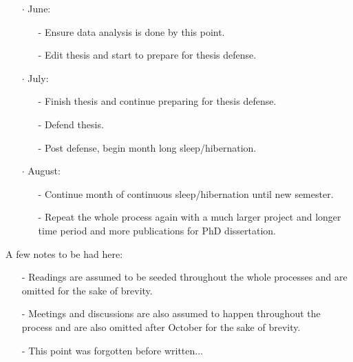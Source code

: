 \documentclass[12pt, letterpaper]{article}
\begin{document}
\begin{itemize}
    \item[$\cdot$] June:
    \begin{itemize}
      \item[-] Ensure data analysis is done by this point.
      \item[-] Edit thesis and start to prepare for thesis defense.\\
    \end{itemize}
    
    \item[$\cdot$] July:
    \begin{itemize}
      \item[-] Finish thesis and continue preparing for thesis defense.
      \item[-] Defend thesis.
      \item[-] Post defense, begin month long sleep/hibernation.\\
    \end{itemize}
    
    \item[$\cdot$] August:
    \begin{itemize}
      \item[-] Continue month of continuous sleep/hibernation until new semester.
      \item[-] Repeat the whole process again with a much larger project and longer time
               period and more publications for PhD dissertation.\\
    \end{itemize}
  \end{itemize}
  
  A few notes to be had here:
  \begin{itemize}
    \item[-] Readings are assumed to be seeded throughout the whole processes and are
             omitted for the sake of brevity.
    \item[-] Meetings and discussions are also assumed to happen throughout the process
             and are also omitted after October for the sake of brevity.
    \item[-] This point was forgotten before written...
  \end{itemize}
\end{document}

